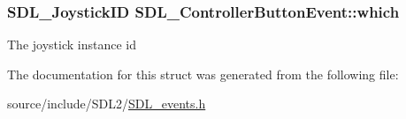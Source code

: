 \subsubsection[{which}]{\setlength{\rightskip}{0pt plus 5cm}S\+D\+L\+\_\+\+Joystick\+I\+D S\+D\+L\+\_\+\+Controller\+Button\+Event\+::which}\label{struct_s_d_l___controller_button_event_a98777e88b5d5cae83eef16ffd4bcacc1}
The joystick instance id 

The documentation for this struct was generated from the following file\+:\begin{DoxyCompactItemize}
\item 
source/include/\+S\+D\+L2/\hyperlink{_s_d_l__events_8h}{S\+D\+L\+\_\+events.\+h}\end{DoxyCompactItemize}
